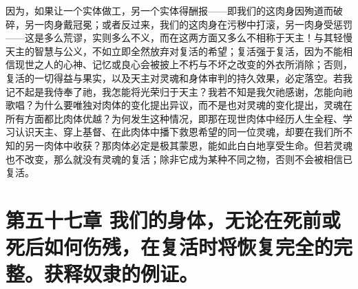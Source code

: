 因为，如果让一个实体做工，另一个实体得酬报——即我们的这肉身因殉道而破碎，另一肉身戴冠冕；或者反过来，我们的这肉身在污秽中打滚，另一肉身受惩罚——这是多么荒谬，实则多么不义，而在这两方面又多么不相称于天主！与其轻慢天主的智慧与公义，不如立即全然放弃对复活的希望；复活强于复活，因为不能相信现世之人的心神、记忆或良心会被披上不朽与不坏之改变的外衣所消除；否则，复活的一切得益与果实，以及天主对灵魂和身体审判的持久效果，必定落空。若我记不起是我侍奉了祂，我怎能将光荣归于天主？我若不知是我欠祂感谢，怎能向祂歌唱？为什么要唯独对肉体的变化提出异议，而不是也对灵魂的变化提出，灵魂在所有方面都比肉体优越？为何发生这种情况，即那在现世肉体中经历人生全程、学习认识天主、穿上基督、在此肉体中播下救恩希望的同一位灵魂，却要在我们所不知的另一肉体中收获？那肉体必定是极其蒙恩，能如此白白地享受生命。但若灵魂也不改变，那么就没有灵魂的复活；除非它成为某种不同之物，否则不会被相信已复活。\par


\section{第五十七章 我们的身体，无论在死前或死后如何伤残，在复活时将恢复完全的完整。获释奴隶的例证。}

